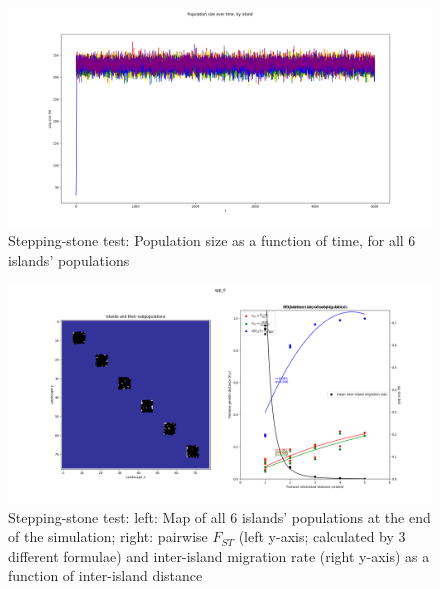 ﻿\documentclass{article}
\begin{document}
\begin{figure}[h!]
\includegraphics[width=175mm]{./img/validation/stepping_stone/pop_size_over_time.png}
\caption{Stepping-stone test: Population size as a function of time, for all 6 islands' populations}
\end{figure}

\begin{figure}[h!]
\includegraphics[width=175mm]{./img/validation/stepping_stone/pop_plot_and_Fst_and_mig_rate_plot.png}
        \caption{Stepping-stone test: left: Map of all 6 islands' populations at the end of the simulation; right: pairwise $F_{ST}$ (left y-axis; calculated by 3 different formulae) and inter-island migration rate (right y-axis) as a function of inter-island distance}
\end{figure}
\end{document}
